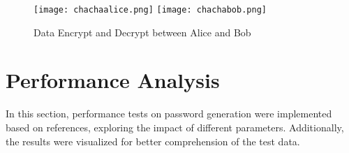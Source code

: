 \begin{figure}
  \centering
  {\texttt{[image: chachaalice.png]}}
  {\texttt{[image: chachabob.png]}}
  \caption{Data Encrypt and Decrypt between Alice and Bob}\label{Data Encrypt and Decrypt}
\end{figure}

\section{Performance Analysis}
In this section, performance tests on password generation were implemented based on references, exploring the impact of different parameters. Additionally, the results were visualized for better comprehension of the test data.
